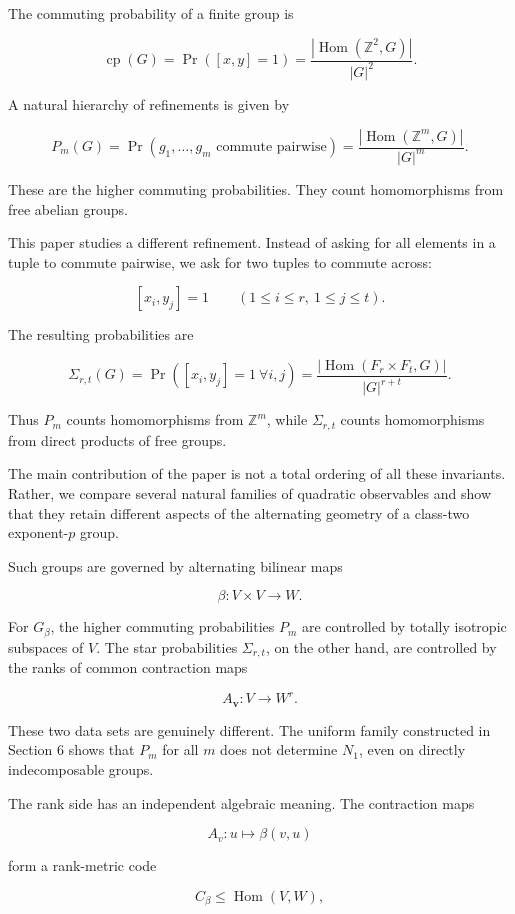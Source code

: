 \documentclass[11pt]{article}
\begin{document}
The commuting probability of a finite group is

\[
\operatorname{cp}(G)
=
\Pr([x,y]=1)
=
\frac{|\operatorname{Hom}(\mathbb Z^2,G)|}{|G|^2}.
\]

A natural hierarchy of refinements is given by

\[
P_m(G)
=
\Pr(g_1,\dots,g_m\text{ commute pairwise})
=
\frac{|\operatorname{Hom}(\mathbb Z^m,G)|}{|G|^m}.
\]

These are the higher commuting probabilities. They count homomorphisms from free abelian groups.

This paper studies a different refinement. Instead of asking for all elements in a tuple to commute pairwise, we ask for two tuples to commute across:

\[
[x_i,y_j]=1
\qquad
(1\le i\le r,\ 1\le j\le t).
\]

The resulting probabilities are

\[
\Sigma_{r,t}(G)
=
\Pr([x_i,y_j]=1\ \forall i,j)
=
\frac{|\operatorname{Hom}(F_r\times F_t,G)|}{|G|^{r+t}}.
\]

Thus $P_m$ counts homomorphisms from $\mathbb Z^m$, while $\Sigma_{r,t}$ counts homomorphisms from direct products of free groups.

The main contribution of the paper is not a total ordering of all these invariants. Rather, we compare several natural families of quadratic observables and show that they retain different aspects of the alternating geometry of a class-two exponent-$p$ group.

Such groups are governed by alternating bilinear maps

\[
\beta:V\times V\to W.
\]

For $G_\beta$, the higher commuting probabilities $P_m$ are controlled by totally isotropic subspaces of $V$. The star probabilities $\Sigma_{r,t}$, on the other hand, are controlled by the ranks of common contraction maps

\[
A_{\mathbf v}:V\to W^r.
\]

These two data sets are genuinely different. The uniform family constructed in Section 6 shows that $P_m$ for all $m$ does not determine $N_1$, even on directly indecomposable groups.

The rank side has an independent algebraic meaning. The contraction maps

\[
A_v:u\mapsto \beta(v,u)
\]

form a rank-metric code

\[
C_\beta\le \operatorname{Hom}(V,W),
\]
\end{document}
